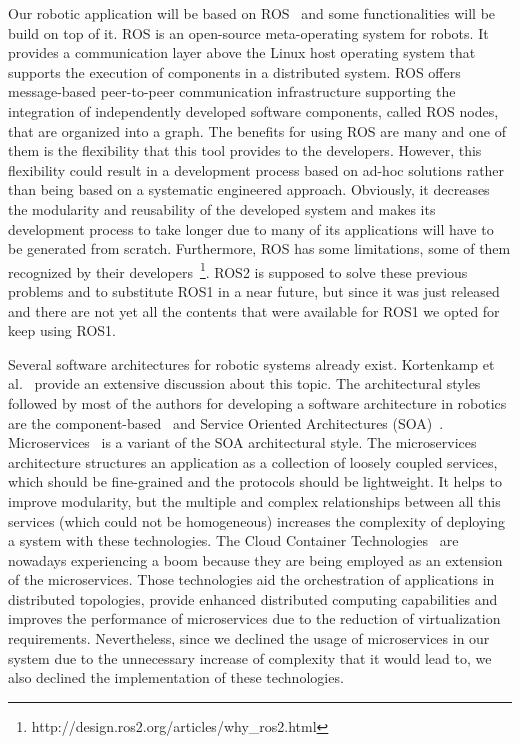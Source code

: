 Our robotic application will be based on ROS~\cite{Quigley2009} and some functionalities will be build on top of it. 
ROS is an open-source meta-operating system for robots. 
It provides a communication layer above the Linux host operating system that supports the execution of components in a distributed system. 
ROS offers message-based peer-to-peer communication infrastructure supporting the integration of independently developed software components, called ROS nodes, that are organized into a graph.
The benefits for using ROS are many and one of them is the flexibility that this tool provides to the developers.
However, this flexibility could result in a development process based on ad-hoc solutions rather than being based on a systematic engineered approach. 
Obviously, it decreases the modularity and reusability of the developed system and makes its development process to take longer due to many of its applications will have to be generated from scratch. 
Furthermore, ROS has some limitations, some of them recognized by their developers~\footnote{http://design.ros2.org/articles/why\_ros2.html}.
ROS2 is supposed to solve these previous problems and to substitute ROS1 in a near future, but since it was just released and there are not yet all the contents that were available for ROS1 we opted for keep using ROS1.

Several software architectures for robotic systems already exist. 
Kortenkamp et al.~\cite{Kortenkamp2008} provide an extensive discussion about this topic. 
The architectural styles followed by most of the authors for developing a software architecture in robotics are the component-based~\cite{Bruyninckx2013,Brugali2012,braberman} and Service Oriented Architectures (SOA)~\cite{Fluckiger2014}.
Microservices~\cite{Newman2015} is a variant of the SOA architectural style. 
The microservices architecture structures an application as a collection of loosely coupled services, which should be fine-grained and the protocols should be lightweight. 
It helps to improve modularity, but the multiple and complex relationships between all this services (which could not be homogeneous) increases the complexity of deploying a system with these technologies. 
The Cloud Container Technologies~\cite{Pahl2017} are nowadays experiencing a boom because they are being employed as an extension of the microservices. 
Those technologies aid the orchestration of applications in distributed topologies, provide enhanced distributed computing capabilities and improves the performance of microservices due to the reduction of virtualization requirements. 
Nevertheless, since we declined the usage of microservices in our system due to the unnecessary increase of complexity that it would lead to, we also declined the implementation of these technologies. 

